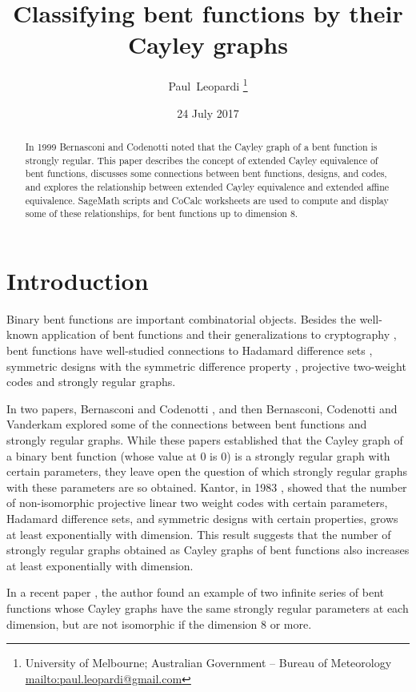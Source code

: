 \documentclass[12pt,a4paper]{article}
\title{Classifying bent functions by their Cayley graphs}
\author{
Paul~Leopardi
\thanks{University of Melbourne; Australian Government -- Bureau of Meteorology
\protect\url{mailto:paul.leopardi@gmail.com}}
}
\date{24 July 2017}
\begin{document}
\maketitle

\begin{abstract}
%
In 1999 Bernasconi and Codenotti noted that the Cayley graph of a bent function is strongly regular.
This paper describes the concept of extended Cayley equivalence of bent functions,
discusses some connections between bent functions, designs, and codes,
and explores the relationship between extended Cayley equivalence and extended affine equivalence.
SageMath scripts and CoCalc worksheets are used to compute and display some of these relationships,
for bent functions up to dimension 8.
%
\end{abstract}

\section{Introduction}
\label{sec-Introduction}
Binary bent functions are important combinatorial objects.
Besides the well-known application of bent functions and their generalizations to cryptography
\cite{Ada97} \cite[4.1-4.6]{Tok15bent},
bent functions have well-studied connections to Hadamard difference sets \cite{Dil74},
symmetric designs with the symmetric difference property \cite{DilS87block,Kan75symplectic},
projective two-weight codes \cite{DinD15class} and strongly regular graphs.

In two papers, Bernasconi and Codenotti \cite{BerC99}, and then Bernasconi, Codenotti and Vanderkam
\cite{BerCV01} explored some of the connections
between bent functions and strongly regular graphs.
While these papers established that the Cayley graph of a binary bent function (whose value at 0 is
0) is a strongly regular graph
with certain parameters, they leave open the question of which strongly regular graphs with these
parameters are so obtained.
Kantor, in 1983 \cite{Kan83exponential}, showed that the number of non-isomorphic projective linear
two weight codes with certain parameters,
Hadamard difference sets, and symmetric designs with certain properties, grows at least exponentially
with dimension.
This result suggests that the number of strongly regular graphs obtained as Cayley graphs of bent
functions also increases at least exponentially with dimension.

In a recent paper \cite{Leo17Hurwitz},
the author found an example of two infinite series of bent functions whose
Cayley graphs have the same strongly regular parameters at each dimension,
but are not isomorphic if the dimension 8 or more.
\end{document}
